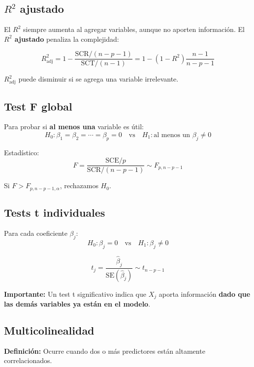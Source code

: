 \documentclass[11pt,a4paper]{article}
\begin{document}
\subsection{$R^2$ ajustado}

El $R^2$ siempre aumenta al agregar variables, aunque no aporten información. El \textbf{$R^2$ ajustado} penaliza la complejidad:

\begin{equation}
R^2_{\text{adj}} = 1 - \frac{\text{SCR}/(n - p - 1)}{\text{SCT}/(n - 1)} = 1 - (1 - R^2)\frac{n - 1}{n - p - 1}
\end{equation}

$R^2_{\text{adj}}$ puede disminuir si se agrega una variable irrelevante.

\subsection{Test F global}

Para probar si \textbf{al menos una} variable es útil:
\[
H_0: \beta_1 = \beta_2 = \cdots = \beta_p = 0 \quad \text{vs} \quad H_1: \text{al menos un } \beta_j \neq 0
\]

Estadístico:
\begin{equation}
F = \frac{\text{SCE}/p}{\text{SCR}/(n - p - 1)} \sim F_{p, n-p-1}
\end{equation}

Si $F > F_{p, n-p-1, \alpha}$, rechazamos $H_0$.

\subsection{Tests t individuales}

Para cada coeficiente $\beta_j$:
\[
H_0: \beta_j = 0 \quad \text{vs} \quad H_1: \beta_j \neq 0
\]

\begin{equation}
t_j = \frac{\hat{\beta}_j}{\text{SE}(\hat{\beta}_j)} \sim t_{n-p-1}
\end{equation}

\textbf{Importante:} Un test t significativo indica que $X_j$ aporta información \textbf{dado que las demás variables ya están en el modelo}.

\subsection{Multicolinealidad}

\textbf{Definición:} Ocurre cuando dos o más predictores están altamente correlacionados.
\end{document}
